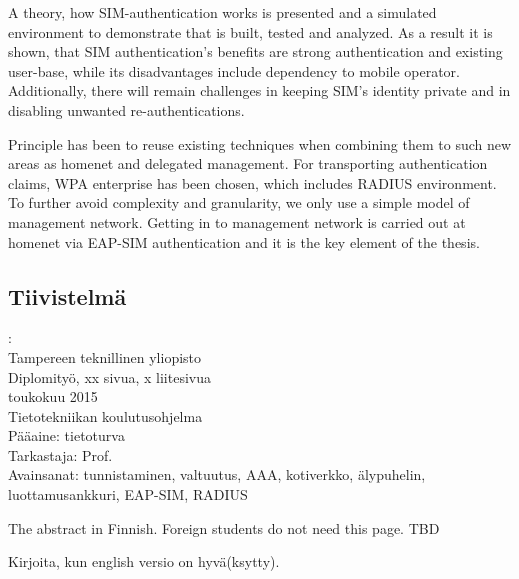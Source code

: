 \documentclass[12pt,a4paper,english]{tutthesis}
\begin{document}
A theory, how SIM-authentication works is presented and a simulated environment
to demonstrate that is built, tested and analyzed.
As a result it is shown, that SIM authentication's benefits are strong
authentication and existing user-base, while its disadvantages include
dependency to mobile operator. Additionally, there will remain challenges in keeping SIM's identity private and in disabling unwanted re-authentications.

Principle has been to reuse existing techniques when combining them to such new areas as homenet and delegated management.
 For transporting authentication claims, WPA enterprise has been chosen, which includes RADIUS environment.
To further avoid complexity and granularity, we
only use a simple model of management network. Getting in to management network is carried out at homenet via EAP-SIM authentication and it is the key element of the thesis.




\begin{otherlanguage}{finnish} %
\chapter*{Tiivistelmä}         %

\begin{spacing}{1.0}
         {\bf \textsf{\MakeUppercase{\@author}}}: \@titleB\\  %
         \textsf{Tampereen teknillinen yliopisto}\\
         \textsf{Diplomityö, xx sivua, x liitesivua}\\ %
         \textsf{toukokuu 2015}\\
         \textsf{Tietotekniikan koulutusohjelma}\\
         \textsf{Pääaine: tietoturva}\\
         \textsf{Tarkastaja:  Prof. \@examiner}\\ %
         \textsf{Avainsanat: tunnistaminen, valtuutus, AAA, kotiverkko, älypuhelin, luottamusankkuri, EAP-SIM, RADIUS}\\
\end{spacing}
The abstract in Finnish. Foreign students do not need this page.
TBD

Kirjoita, kun english versio on hyvä(ksytty).
\end{otherlanguage} %
\end{document}

